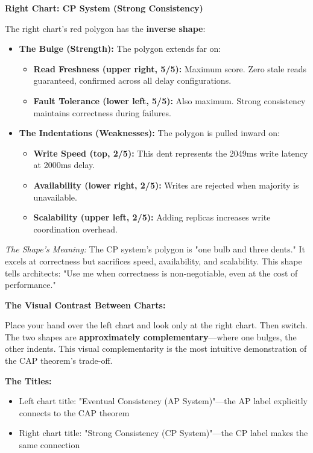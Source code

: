 \documentclass[10pt,a4paper]{article}
\begin{document}
\textbf{Right Chart: CP System (Strong Consistency)}

The right chart's red polygon has the \textbf{inverse shape}:

\begin{itemize}
    \item \textbf{The Bulge (Strength):} The polygon extends far on:
    \begin{itemize}
        \item \textbf{Read Freshness (upper right, 5/5):} Maximum score. Zero stale reads guaranteed, confirmed across all delay configurations.
        \item \textbf{Fault Tolerance (lower left, 5/5):} Also maximum. Strong consistency maintains correctness during failures.
    \end{itemize}
    
    \item \textbf{The Indentations (Weaknesses):} The polygon is pulled inward on:
    \begin{itemize}
        \item \textbf{Write Speed (top, 2/5):} This dent represents the 2049ms write latency at 2000ms delay.
        \item \textbf{Availability (lower right, 2/5):} Writes are rejected when majority is unavailable.
        \item \textbf{Scalability (upper left, 2/5):} Adding replicas increases write coordination overhead.
    \end{itemize}
\end{itemize}

\textit{The Shape's Meaning:} The CP system's polygon is "one bulb and three dents." It excels at correctness but sacrifices speed, availability, and scalability. This shape tells architects: "Use me when correctness is non-negotiable, even at the cost of performance."

\textbf{The Visual Contrast Between Charts:}

Place your hand over the left chart and look only at the right chart. Then switch. The two shapes are \textbf{approximately complementary}---where one bulges, the other indents. This visual complementarity is the most intuitive demonstration of the CAP theorem's trade-off.

\textbf{The Titles:}

\begin{itemize}
    \item Left chart title: "Eventual Consistency (AP System)"---the AP label explicitly connects to the CAP theorem
    \item Right chart title: "Strong Consistency (CP System)"---the CP label makes the same connection
\end{itemize}
\end{document}
